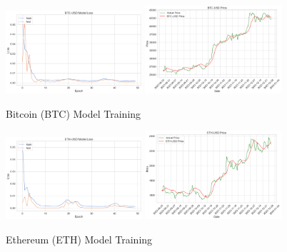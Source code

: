 \documentclass{ledger}
\begin{document}
\begin{figure}[htbp]
    \centering
    \includegraphics[width=0.45\textwidth]{code/price-prediction/lstm/images/btc_usd_loss.png} %
    \hspace{0.05\textwidth} %
    \includegraphics[width=0.45\textwidth]{code/price-prediction/lstm/images/btc_usd_price.png} %
    \caption{Bitcoin (BTC) Model Training}
    \label{fig:side_by_side}
\end{figure}

\begin{figure}[htbp]
    \centering
    \includegraphics[width=0.45\textwidth]{code/price-prediction/lstm/images/eth_usd_loss.png} %
    \hspace{0.05\textwidth} %
    \includegraphics[width=0.45\textwidth]{code/price-prediction/lstm/images/eth_usd_model.png} %
    \caption{Ethereum (ETH) Model Training}
    \label{fig:side_by_side}
\end{figure}
\end{document}
